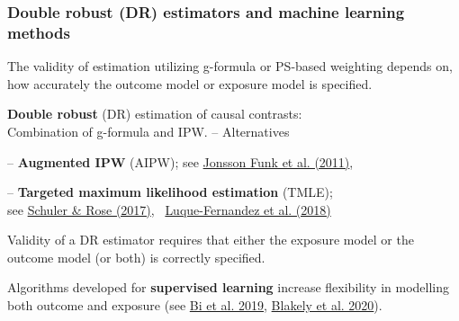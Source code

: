 \documentclass[12pt,dvipsnames,t,aspectratio=169, handout%
]{beamer}
\begin{document}
\begin{frame}
\frametitle{Double robust (DR) estimators and machine learning methods}
\bi
\item
The validity of estimation utilizing g-formula or PS-based weighting depends on, how accurately
the outcome model or exposure model is specified.
\pause
\medskip
\item
{\bf Double robust} (DR) estimation 
of causal contrasts: \\
Combination of g-formula and IPW.
\pause 
-- Alternatives
\bi
{\normalsize
\item[--]
 {\bf Augmented IPW} (AIPW); {\small see \href{https://doi.org/10.1093/aje/kwq439}{\color{blue}Jonsson Funk et al. (2011)}},\\
\medskip
\item[--] {\bf Targeted maximum likelihood estimation} (TMLE); \\ 
 {\small see \href{https://doi.org/10.1093/aje/kww165}{\color{blue}Schuler \& Rose (2017)}, \
  \href{https://doi.org/10.1002/sim.7628}{\color{blue}Luque-Fernandez et al. (2018)}} 
}
\ei
\pause
Validity of a DR estimator requires that either the exposure model 
or the outcome model (or both) is correctly specified.
\pause
\medskip
\item Algorithms developed for {\bf supervised learning} 
increase flexibility in modelling both outcome and exposure 
{\small (see \href{https://doi.org/10.1093/aje/kwz189}{\color{blue}Bi et al. 2019}, 
\href{https://doi.org/10.1093/ije/dyz132}{\color{blue}Blakely et al. 2020})}.
\ei 
\end{frame}
\end{document}
